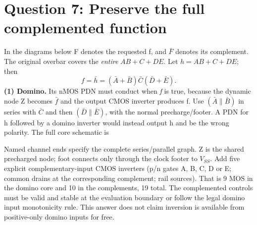 \documentclass[10pt]{article}
\newcommand{\mos}[4]{\begin{scope}[shift={(#1,#2)}]
\draw(0,.24)--(0,-.24);\draw(0,.2)--(.25,.2)--(.25,.5);\draw(0,-.2)--(.25,-.2)--(.25,-.5);
\draw(-.16,.23)--(-.16,-.23);
\ifnum#4=1\draw(-.26,0)circle(.06);\draw(-.75,0)--(-.32,0);\else\draw(-.75,0)--(-.16,0);\fi
\node[anchor=east,font=\scriptsize]at(-.76,0){$#3$};\end{scope}}
\begin{document}
\newpage\section*{Question 7: Preserve the full complemented function}
In the diagrams below F denotes the requested f, and $\bar F$ denotes its complement. The original overbar covers the \emph{entire} $AB+C+DE$. Let $h=AB+C+DE$; then
\[\boxed{f=\bar h=(\bar A+\bar B)\bar C(\bar D+\bar E).}\]
\textbf{(1) Domino.} Its nMOS PDN must conduct when \emph{f} is true, because the dynamic node Z becomes $\bar f$ and the output CMOS inverter produces f. Use $(\bar A\parallel\bar B)$ in series with $\bar C$ and then $(\bar D\parallel\bar E)$, with the normal precharge/footer. A PDN for h followed by a domino inverter would instead output h and be the wrong polarity. The full core schematic is
\begin{center}\end{center}
Named channel ends specify the complete series/parallel graph. Z is the shared precharged node; foot connects only through the clock footer to $V_{SS}$. Add five explicit complementary-input CMOS inverters (p/n gates A, B, C, D or E; common drains at the corresponding complement; rail sources). That is 9 MOS in the domino core and 10 in the complements, 19 total. The complemented controls must be valid and stable at the evaluation boundary or follow the legal domino input monotonicity rule. This answer does not claim inversion is available from positive-only domino inputs for free.
\end{document}
